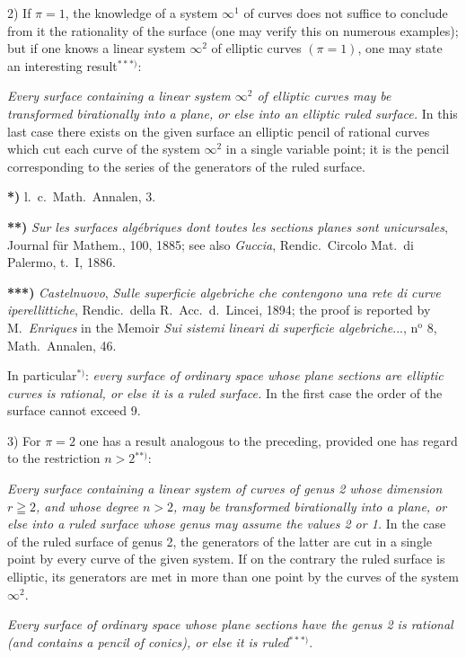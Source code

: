 \documentclass{article}
\begin{document}
2) If $\pi = 1$, the knowledge of a system $\infty^{1}$ of curves does not suffice to conclude from it the rationality of the surface (one may verify this on numerous examples); but if one knows a linear system $\infty^{2}$ of elliptic curves $(\pi = 1)$, one may state an interesting result${}^{***)}$:

\emph{Every surface containing a linear system $\infty^{2}$ of elliptic curves may be transformed birationally into a plane, or else into an elliptic ruled surface.} In this last case there exists on the given surface an elliptic pencil of rational curves which cut each curve of the system $\infty^{2}$ in a single variable point; it is the pencil corresponding to the series of the generators of the ruled surface.

\textbf{*)} l.\ c.\ Math.\ Annalen, 3.

\textbf{**)} \emph{Sur les surfaces algébriques dont toutes les sections planes sont unicursales}, Journal für Mathem., 100, 1885; see also \emph{Guccia}, Rendic.\ Circolo Mat.\ di Palermo, t.\ I, 1886.

\textbf{***)} \emph{Castelnuovo}, \emph{Sulle superficie algebriche che contengono una rete di curve iperellittiche}, Rendic.\ della R.\ Acc.\ d.\ Lincei, 1894; the proof is reported by M.\ \emph{Enriques} in the Memoir \emph{Sui sistemi lineari di superficie algebriche}..., n${}^{\text{o}}$ 8, Math.\ Annalen, 46.


In particular${}^{*)}$: \emph{every surface of ordinary space whose plane sections are elliptic curves is rational, or else it is a ruled surface.} In the first case the order of the surface cannot exceed 9.

3) For $\pi = 2$ one has a result analogous to the preceding, provided one has regard to the restriction $n > 2$${}^{**)}$:

\emph{Every surface containing a linear system of curves of genus 2 whose dimension $r \geqq 2$, and whose degree $n > 2$, may be transformed birationally into a plane, or else into a ruled surface whose genus may assume the values 2 or 1.} In the case of the ruled surface of genus 2, the generators of the latter are cut in a single point by every curve of the given system. If on the contrary the ruled surface is elliptic, its generators are met in more than one point by the curves of the system $\infty^{2}$.

\emph{Every surface of ordinary space whose plane sections have the genus 2 is rational (and contains a pencil of conics), or else it is ruled}${}^{***)}$.
\end{document}

